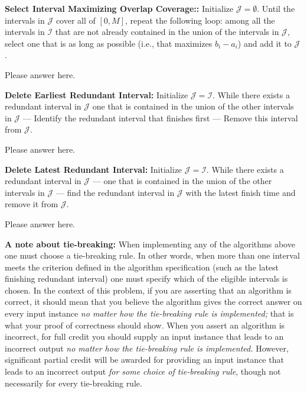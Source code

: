 \documentclass{hw_template}
\begin{document}
\begin{problem}
  \begin{subproblem}
    \textbf{Select Interval Maximizing Overlap Coverage::}
  Initialize $\mathcal{J}=\emptyset$.
  Until the intervals in $\mathcal{J}$ cover all of $[0,M]$,
  repeat the following loop: among all the intervals in
  $\mathcal{I}$ that are not already contained in the union
  of the intervals in $\mathcal{J}$, select one that is as
  long as possible (i.e., that maximizes $b_i-a_i$) and
  add it to $\mathcal{J}$.
  \end{subproblem}

\begin{solution}
Please answer here.
\end{solution}

  \begin{subproblem}
    \textbf{Delete Earliest Redundant Interval:}
    Initialize $\mathcal{J}=\mathcal{I}$. While there
  exists a redundant interval in $\mathcal{J}$ one
  that is contained in the union of the other intervals
  in $\mathcal{J}$ --- Identify the redundant interval that finishes first --- Remove this interval from $\mathcal{J}$.
\end{subproblem}

\begin{solution}
Please answer here.
\end{solution}

\begin{subproblem}
    \textbf{Delete Latest Redundant Interval:}
  Initialize $\mathcal{J}=\mathcal{I}$. While there
  exists a redundant interval in $\mathcal{J}$ --- one
  that is contained in the union of the other intervals
  in $\mathcal{J}$ --- find the redundant interval in
  $\mathcal{J}$ with the latest finish time and remove it
  from $\mathcal{J}$.
\end{subproblem}

\begin{solution}
Please answer here.
\end{solution}

{\bf A note about tie-breaking:}
When implementing any of the algorithms above one must
choose a tie-breaking rule. In other words, when more than
one interval meets the criterion defined in the algorithm
specification (such as the latest finishing redundant
interval) one must specify which of the eligible
intervals is chosen. In the context of this problem,
if you are asserting that an algorithm is correct,
it should mean that you believe the algorithm gives
the correct answer on every input instance
{\em no matter how the tie-breaking rule is implemented;}
that is what your proof of correctness should show.
When you assert an algorithm is incorrect,
for full credit you should supply an input instance
that leads to an incorrect output {\em no matter how
the tie-breaking rule is implemented.} However,
significant partial credit will be awarded for
providing an input instance that leads to an incorrect
output {\em for some choice of tie-breaking rule},
though not necessarily for every tie-breaking rule.


\end{problem}
\end{document}
